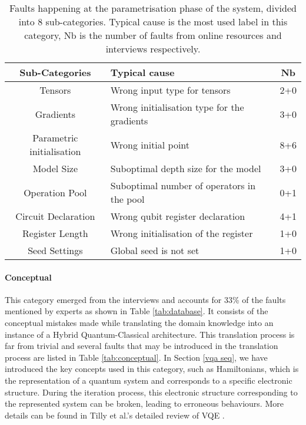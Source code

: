 \begin{table}[hbt!]
    \centering
        \caption{Faults happening at the parametrisation phase of the system, divided into 8 sub-categories. Typical cause is the most used label in this category, Nb is the number of faults from online resources and interviews respectively.}
    \label{tab:parametrisation}

    \begin{tabular}{@{}c|l|c}
       \textbf{Sub-Categories} & \textbf{Typical cause} & \textbf{Nb} \\
         \hline
       Tensors  & Wrong input type for tensors & 2+0 \\
         \hline
       Gradients  & Wrong initialisation type for the gradients & 3+0 \\
         \hline
        Parametric initialisation & Wrong initial point & 8+6 \\
          \hline
        Model Size & Suboptimal depth size for the model  & 3+0 \\
          \hline
        Operation Pool & Suboptimal number of operators in the pool & 0+1 \\
          \hline
        Circuit Declaration & Wrong qubit register declaration & 4+1 \\
          \hline
        Register Length & Wrong initialisation of the register & 1+0 \\
          \hline
        Seed Settings & Global seed is not set  & 1+0 \\
    \end{tabular}
\end{table}

\paragraph{Conceptual}
\label{conceptualisation}
This category emerged from the interviews and accounts for 33\% of the faults mentioned by experts as shown in Table \ref{tab:database}. It consists of the conceptual mistakes made while translating the domain knowledge into an instance of a Hybrid Quantum-Classical architecture. This translation process is far from trivial and several faults that may be introduced in the translation process are listed in Table 
\ref{tab:conceptual}. In Section \ref{vqa seq}, we have introduced the key concepts used in this category, such as Hamiltonians, which is the representation of a quantum system and corresponds to a specific electronic structure. During the iteration process, this electronic structure corresponding to the represented system can be broken, leading to erroneous behaviours. More details can be found in Tilly et al.'s detailed review of VQE \cite{tilly_variational_2022}.

